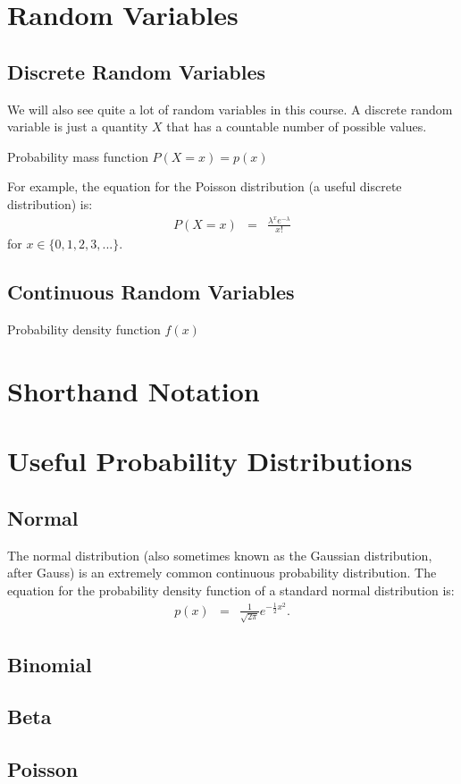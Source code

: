 \section{Random Variables}

\subsection{Discrete Random Variables}
We will also see quite a lot of random variables in this course. A discrete
random variable is just a quantity $X$ that has a countable number of possible
values.

Probability mass function
$P(X=x) = p(x)$

For example, the equation for the Poisson distribution (a useful discrete
distribution) is:
\begin{eqnarray}
P(X=x) &=& \frac{\lambda^x e^{-\lambda}}{x!}
\end{eqnarray}
for $x \in \{0, 1, 2, 3, ...\}$.

\subsection{Continuous Random Variables}
Probability density function
$f(x)$


\section{Shorthand Notation}



\section{Useful Probability Distributions}

\subsection{Normal}
The normal distribution (also sometimes known as the Gaussian distribution,
after Gauss) is an extremely common continuous probability distribution.
The equation for the probability density function of a standard normal
distribution is:
\begin{eqnarray}
p(x) &=& \frac{1}{\sqrt{2\pi}}e^{-\frac{1}{2}x^2}.
\end{eqnarray}

\subsection{Binomial}


\subsection{Beta}


\subsection{Poisson}



